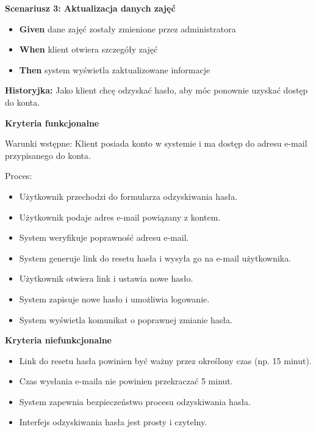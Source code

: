 \documentclass[a4paper,12pt]{article}
\begin{document}
\textbf{Scenariusz 3: Aktualizacja danych zajęć}
\begin{itemize}
    \item \textbf{Given} dane zajęć zostały zmienione przez administratora
    \item \textbf{When} klient otwiera szczegóły zajęć
    \item \textbf{Then} system wyświetla zaktualizowane informacje
\end{itemize}

\vspace{0,5cm}

\noindent \textbf{Historyjka:} Jako klient chcę odzyskać hasło, aby móc ponownie uzyskać dostęp do konta.

\vspace{0,2cm}

\noindent \textbf{Kryteria funkcjonalne}

\vspace{0,2cm}

\noindent Warunki wstępne: Klient posiada konto w systemie i ma dostęp do adresu e-mail przypisanego do konta.

\vspace{0,2cm}

\noindent Proces:

\begin{itemize}
    \item Użytkownik przechodzi do formularza odzyskiwania hasła.
    \item Użytkownik podaje adres e-mail powiązany z kontem.
    \item System weryfikuje poprawność adresu e-mail.
    \item System generuje link do resetu hasła i wysyła go na e-mail użytkownika.
    \item Użytkownik otwiera link i ustawia nowe hasło.
    \item System zapisuje nowe hasło i umożliwia logowanie.
    \item System wyświetla komunikat o poprawnej zmianie hasła.
\end{itemize}

\noindent \textbf{Kryteria niefunkcjonalne}
\begin{itemize}
    \item Link do resetu hasła powinien być ważny przez określony czas (np. 15 minut).
    \item Czas wysłania e-maila nie powinien przekraczać 5 minut.
    \item System zapewnia bezpieczeństwo procesu odzyskiwania hasła.
    \item Interfejs odzyskiwania hasła jest prosty i czytelny.
\end{itemize}
\end{document}
